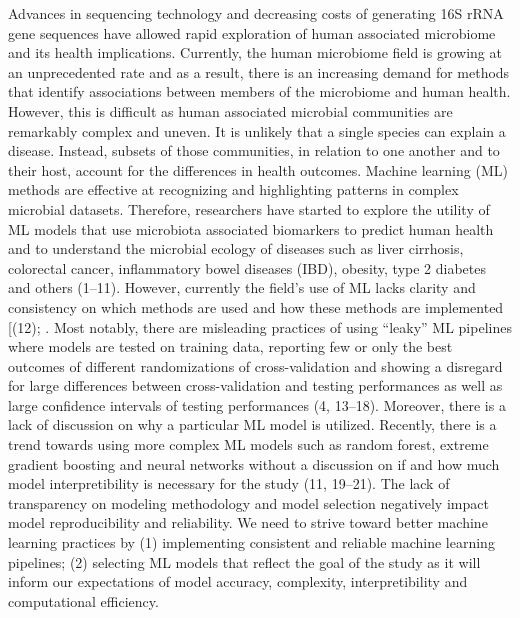 \documentclass[11pt,]{article}
\begin{document}
Advances in sequencing technology and decreasing costs of generating 16S
rRNA gene sequences have allowed rapid exploration of human associated
microbiome and its health implications. Currently, the human microbiome
field is growing at an unprecedented rate and as a result, there is an
increasing demand for methods that identify associations between members
of the microbiome and human health. However, this is difficult as human
associated microbial communities are remarkably complex and uneven. It
is unlikely that a single species can explain a disease. Instead,
subsets of those communities, in relation to one another and to their
host, account for the differences in health outcomes. Machine learning
(ML) methods are effective at recognizing and highlighting patterns in
complex microbial datasets. Therefore, researchers have started to
explore the utility of ML models that use microbiota associated
biomarkers to predict human health and to understand the microbial
ecology of diseases such as liver cirrhosis, colorectal cancer,
inflammatory bowel diseases (IBD), obesity, type 2 diabetes and others
(1--11). However, currently the field's use of ML lacks clarity and
consistency on which methods are used and how these methods are
implemented {[}(12); . Most notably, there are misleading practices of
using ``leaky'' ML pipelines where models are tested on training data,
reporting few or only the best outcomes of different randomizations of
cross-validation and showing a disregard for large differences between
cross-validation and testing performances as well as large confidence
intervals of testing performances (4, 13--18). Moreover, there is a lack
of discussion on why a particular ML model is utilized. Recently, there
is a trend towards using more complex ML models such as random forest,
extreme gradient boosting and neural networks without a discussion on if
and how much model interpretibility is necessary for the study (11,
19--21). The lack of transparency on modeling methodology and model
selection negatively impact model reproducibility and reliability. We
need to strive toward better machine learning practices by (1)
implementing consistent and reliable machine learning pipelines; (2)
selecting ML models that reflect the goal of the study as it will inform
our expectations of model accuracy, complexity, interpretibility and
computational efficiency.
\end{document}
